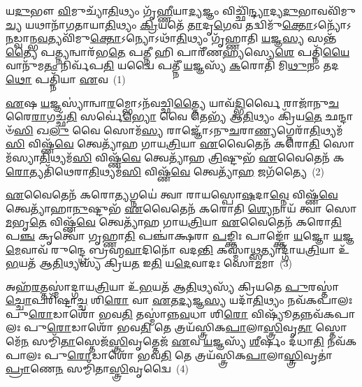 \setcounter{anuvakam}{0}
𑌯\-\ul{𑌦𑍁}\-𑌭𑍗 \ul{𑌵𑌿}\-𑌮𑍁𑌚𑍍𑌯𑌾᳴\-\ul{𑌤𑌿}\-𑌥𑍍𑌯𑌂 𑌗𑍃᳴\-\ul{𑌹𑍍𑌣𑍀}\-𑌯𑌾\-\ul{𑌦𑍍𑌯}\-𑌜𑍍𑌞𑌂 𑌵𑌿𑌚𑍍𑌛𑌿᳴\-\ul{𑌨𑍍𑌦𑍍𑌯𑌾}\-𑌦𑍍𑌯\-\ul{𑌦𑍁}\-𑌭𑌾𑌵𑌵𑌿᳴𑌮𑍁\-\ul{𑌚𑍍𑌯} 𑌯𑌥𑌾𑌨𑌾᳴𑌗𑌤𑌾𑌯𑌾\-\ul{𑌤𑌿}\-𑌥𑍍𑌯𑌂 \ul{𑌕𑍍𑌰𑌿}\-𑌯𑌤𑍇᳴ \ul{𑌤𑌾}\-𑌦𑍃\-\ul{𑌗𑍇}\-𑌵 𑌤𑌦𑍍𑌵𑌿𑌮𑍁᳴\-\ul{𑌕𑍍𑌤𑍋}\-\-𑌽𑌨𑍍𑌯𑍋᳴\-𑌽\-\ul{𑌨}\-𑌡𑍍𑌵𑌾𑌨𑍍𑌭\-\ul{𑌵}\-𑌤𑍍𑌯𑌵𑌿᳴𑌮𑍁\-\ul{𑌕𑍍𑌤𑍋}\-\-𑌽𑌨𑍍𑌯𑍋\-𑌽𑌥𑌾᳴\-\ul{𑌤𑌿}\-𑌥𑍍𑌯𑌂 𑌗𑍃᳴𑌹𑍍𑌣𑌾𑌤𑌿 \ul{𑌯}\-𑌜𑍍𑌞\-\ul{𑌸𑍍𑌯} 𑌸𑌨𑍍𑌤᳴\-\ul{𑌤𑍍𑌯𑍈} 𑌪\-\ul{𑌤𑍍𑌨𑍍𑌯}\-𑌨𑍍𑌵𑌾𑌰᳴𑌭\-\ul{𑌤𑍇} 𑌪\-\ul{𑌤𑍍𑌨𑍀} 𑌹𑌿 𑌪𑌾𑌰𑍀᳴𑌣\-\ul{𑌹𑍍𑌯}\-𑌸𑍍𑌯𑍇\-\ul{𑌶𑍇} 𑌪𑌤𑍍𑌨𑌿᳴\-\ul{𑌯𑍈}\-𑌵𑌾𑌨𑍁᳴𑌮\-\ul{𑌤𑌂} 𑌨𑌿𑌰𑍍𑌵᳴𑌪\-\ul{𑌤𑌿} 𑌯𑌦𑍍𑌵𑍈 𑌪𑌤𑍍𑌨𑍀᳴ \ul{𑌯}\-𑌜𑍍𑌞𑌸𑍍𑌯᳴ \ul{𑌕}\-𑌰𑍋𑌤𑌿᳴ 𑌮𑌿\-\ul{𑌥𑍁}\-𑌨𑌂 𑌤𑌦\-\ul{𑌥𑍋} 𑌪𑌤𑍍𑌨𑌿᳴𑌯𑌾 \ul{𑌏}\-𑌵~(1)

\-\ul{𑌏}\-𑌷 \ul{𑌯}\-𑌜𑍍𑌞𑌸𑍍𑌯𑌾॑𑌨𑍍𑌵𑌾\-\ul{𑌰}\-𑌮𑍍𑌭𑍋\-𑌽𑌨᳴𑌵𑌚𑍍𑌛𑌿\-\ul{𑌤𑍍𑌤𑍍𑌯𑍈} 𑌯𑌾𑌵᳴\-\ul{𑌦𑍍𑌭𑌿}\-𑌰𑍍𑌵𑍈 𑌰𑌾𑌜𑌾᳴𑌨𑍁\-\ul{𑌚}\-𑌰𑍈\-\ul{𑌰𑌾}\-𑌗𑌚𑍍𑌛᳴\-\ul{𑌤𑌿} 𑌸𑌰𑍍𑌵𑍇॑\-\ul{𑌭𑍍𑌯𑍋} 𑌵𑍈 𑌤𑍇𑌭𑍍𑌯᳴ 𑌆\-\ul{𑌤𑌿}\-𑌥𑍍𑌯𑌂 𑌕𑍍𑌰𑌿᳴𑌯\-\ul{𑌤𑍇} 𑌛𑌨𑍍𑌦𑌾𑍞᳴\-\ul{𑌸𑌿} 𑌖\-\ul{𑌲𑍁} 𑌵𑍈 𑌸𑍋𑌮᳴\-\ul{𑌸𑍍𑌯} 𑌰𑌾𑌜𑍍𑌞𑍋᳴\-𑌽𑌨𑍁\-\ul{𑌚}\-𑌰𑌾\-\ul{𑌣𑍍𑌯}\-𑌗𑍍𑌨𑍇𑌰𑌾᳴\-\ul{𑌤𑌿}\-𑌥𑍍𑌯𑌮᳴\-\ul{𑌸𑌿} 𑌵𑌿𑌷𑍍𑌣᳴\-\ul{𑌵𑍇} 𑌤𑍍𑌵𑍇𑌤𑍍𑌯𑌾᳴𑌹 𑌗𑌾𑌯\-\ul{𑌤𑍍𑌰𑌿}\-𑌯𑌾 \ul{𑌏}\-𑌵𑍈𑌤𑍇𑌨᳴ 𑌕𑌰𑍋\-\ul{𑌤𑌿} 𑌸𑍋𑌮᳴𑌸𑍍𑌯𑌾\-\ul{𑌤𑌿}\-𑌥𑍍𑌯𑌮᳴\-\ul{𑌸𑌿} 𑌵𑌿𑌷𑍍𑌣᳴\-\ul{𑌵𑍇} 𑌤𑍍𑌵𑍇𑌤𑍍𑌯𑌾᳴𑌹 \ul{𑌤𑍍𑌰𑌿}\-𑌷𑍍𑌟𑍁𑌭᳴ \ul{𑌏}\-𑌵𑍈𑌤𑍇𑌨᳴ 𑌕\-\ul{𑌰𑍋}\-𑌤𑍍𑌯𑌤𑌿᳴𑌥𑍇𑌰𑌾\-\ul{𑌤𑌿}\-𑌥𑍍𑌯𑌮᳴\-\ul{𑌸𑌿} 𑌵𑌿𑌷𑍍𑌣᳴\-\ul{𑌵𑍇} 𑌤𑍍𑌵𑍇𑌤𑍍𑌯𑌾᳴\-\ul{𑌹} 𑌜𑌗᳴𑌤𑍍𑌯𑍈~(2)

\-\ul{𑌏}\-𑌵𑍈𑌤𑍇𑌨᳴ 𑌕𑌰𑍋\-\ul{𑌤𑍍𑌯}\-𑌗𑍍𑌨𑌯𑍇॑ 𑌤𑍍𑌵𑌾 𑌰𑌾𑌯𑌸𑍍𑌪𑍋\-\ul{𑌷}\-𑌦𑌾\-\ul{𑌵𑍍𑌨𑍇} 𑌵𑌿𑌷𑍍𑌣᳴\-\ul{𑌵𑍇} 𑌤𑍍𑌵𑍇𑌤𑍍𑌯𑌾᳴𑌹𑌾\-\ul{𑌨𑍁}\-𑌷𑍍𑌟𑍁𑌭᳴ \ul{𑌏}\-𑌵𑍈𑌤𑍇𑌨᳴ 𑌕𑌰𑍋𑌤𑌿 \ul{𑌶𑍍𑌯𑍇}\-𑌨𑌾𑌯᳴ 𑌤𑍍𑌵𑌾 𑌸𑍋\-\ul{𑌮}\-𑌭𑍃\-\ul{𑌤𑍇} 𑌵𑌿𑌷𑍍𑌣᳴\-\ul{𑌵𑍇} 𑌤𑍍𑌵𑍇𑌤𑍍𑌯𑌾᳴𑌹 𑌗𑌾𑌯\-\ul{𑌤𑍍𑌰𑌿}\-𑌯𑌾 \ul{𑌏}\-𑌵𑍈𑌤𑍇𑌨᳴ 𑌕𑌰𑍋\-\ul{𑌤𑌿} 𑌪\-\ul{𑌞𑍍𑌚} 𑌕𑍃𑌤𑍍𑌵𑍋᳴ 𑌗𑍃𑌹𑍍𑌣𑌾\-\ul{𑌤𑌿} 𑌪𑌞𑍍𑌚𑌾॑𑌕𑍍𑌷𑌰𑌾 \ul{𑌪}\-𑌙𑍍𑌕𑍍𑌤𑌿𑌃 𑌪𑌾𑌙𑍍𑌕𑍍𑌤𑍋᳴ \ul{𑌯}\-𑌜𑍍𑌞𑍋 \ul{𑌯}\-𑌜𑍍𑌞\-\ul{𑌮𑍇}\-𑌵𑌾𑌵᳴ 𑌰𑍁𑌨𑍍𑌦𑍍𑌧𑍇 𑌬𑍍𑌰𑌹𑍍𑌮\-\ul{𑌵𑌾}\-𑌦𑌿𑌨𑍋᳴ 𑌵𑌦\-\ul{𑌨𑍍𑌤𑌿} 𑌕𑌸𑍍𑌮𑌾॑\-\ul{𑌥𑍍𑌸}\-𑌤𑍍𑌯𑌾𑌦𑍍𑌗𑌾᳴𑌯\-\ul{𑌤𑍍𑌰𑌿}\-𑌯𑌾 𑌉᳴\-\ul{𑌭}\-𑌯𑌤᳴ 𑌆\-\ul{𑌤𑌿}\-𑌥𑍍𑌯𑌸𑍍𑌯᳴ 𑌕𑍍𑌰𑌿𑌯\-\ul{𑌤} 𑌇\-\ul{𑌤𑌿} 𑌯\-\ul{𑌦𑍇}\-𑌵𑌾𑌦𑌃 𑌸𑍋\-\ul{𑌮}\-𑌮𑌾~(3)

𑌅𑌹᳴\-\ul{𑌰}\-𑌤𑍍𑌤𑌸𑍍𑌮𑌾॑𑌦𑍍𑌗𑌾𑌯\-\ul{𑌤𑍍𑌰𑌿}\-𑌯𑌾 𑌉᳴\-\ul{𑌭}\-𑌯𑌤᳴ 𑌆\-\ul{𑌤𑌿}\-𑌥𑍍𑌯𑌸𑍍𑌯᳴ 𑌕𑍍𑌰𑌿𑌯𑌤𑍇 \ul{𑌪𑍁}\-𑌰𑌸𑍍𑌤𑌾॑\-\ul{𑌚𑍍𑌚𑍋}\-𑌪𑌰𑌿᳴𑌷𑍍𑌟𑌾\-\ul{𑌚𑍍𑌚} 𑌶𑌿\-\ul{𑌰𑍋} 𑌵𑌾 \ul{𑌏}\-𑌤\-\ul{𑌦𑍍𑌯}\-𑌜𑍍𑌞\-\ul{𑌸𑍍𑌯} 𑌯𑌦𑌾᳴\-\ul{𑌤𑌿}\-𑌥𑍍𑌯𑌂 𑌨𑌵᳴𑌕𑌪𑌾𑌲𑌃 𑌪𑍁\-\ul{𑌰𑍋}\-𑌡𑌾𑌶𑍋᳴ 𑌭𑌵\-\ul{𑌤𑌿} 𑌤𑌸𑍍𑌮𑌾॑𑌨𑍍𑌨\-\ul{𑌵}\-𑌧𑌾 𑌶𑌿\-\ul{𑌰𑍋} 𑌵𑌿𑌷𑍍𑌯𑍂᳴\-\ul{𑌤}\-𑌨𑍍𑌨𑌵᳴𑌕𑌪𑌾𑌲𑌃 𑌪𑍁\-\ul{𑌰𑍋}\-𑌡𑌾𑌶𑍋᳴ 𑌭𑌵\-\ul{𑌤𑌿} 𑌤𑍇 𑌤𑍍𑌰𑌯᳴𑌸𑍍𑌤𑍍𑌰𑌿𑌕\-\ul{𑌪𑌾}\-𑌲𑌾\-\ul{𑌸𑍍𑌤𑍍𑌰𑌿}\-𑌵𑍃\-\ul{𑌤𑌾} 𑌸𑍍𑌤𑍋𑌮𑍇᳴\-\ul{𑌨} 𑌸𑌮𑍍𑌮𑌿᳴\-\ul{𑌤𑌾}\-𑌸𑍍𑌤𑍇𑌜᳴\-\ul{𑌸𑍍𑌤𑍍𑌰𑌿}\-𑌵𑍃𑌤𑍍𑌤𑍇𑌜᳴ \ul{𑌏}\-𑌵 \ul{𑌯}\-𑌜𑍍𑌞𑌸𑍍𑌯᳴ \ul{𑌶𑍀}\-𑌰𑍍\mbox{}𑌷𑌂 𑌦᳴𑌧𑌾\-\ul{𑌤𑌿} 𑌨𑌵᳴𑌕𑌪𑌾𑌲𑌃 𑌪𑍁\-\ul{𑌰𑍋}\-𑌡𑌾𑌶𑍋᳴ 𑌭𑌵\-\ul{𑌤𑌿} 𑌤𑍇 𑌤𑍍𑌰𑌯᳴𑌸𑍍𑌤𑍍𑌰𑌿𑌕\-\ul{𑌪𑌾}\-𑌲𑌾\-\ul{𑌸𑍍𑌤𑍍𑌰𑌿}\-𑌵𑍃𑌤𑌾॑ \ul{𑌪𑍍𑌰𑌾}\-𑌣𑍇\-\ul{𑌨} 𑌸𑌮𑍍𑌮𑌿᳴𑌤𑌾\-\ul{𑌸𑍍𑌤𑍍𑌰𑌿}\-𑌵𑍃𑌦𑍍𑌵𑍈~(4)


